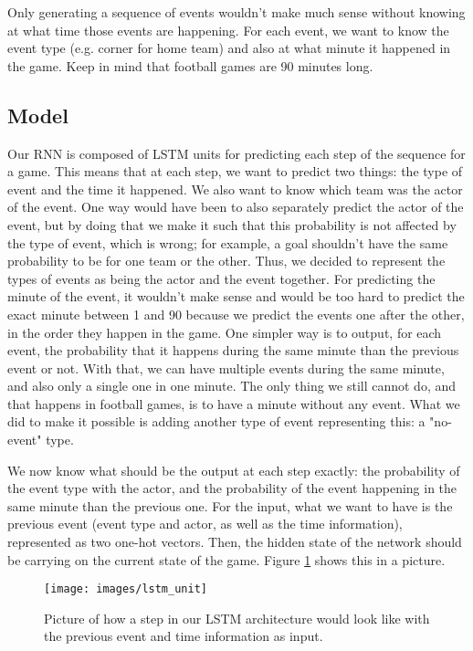 \documentclass[10pt,conference,onecolumn]{IEEEtran}
\begin{document}
Only generating a sequence of events wouldn't make much sense without knowing at what time those events are happening. For each event, we want to know the event type (e.g. corner for home team) and also at what minute it happened in the game. Keep in mind that football games are 90 minutes long.

\subsection{Model}
Our RNN is composed of LSTM units for predicting each step of the sequence for a game. This means that at each step, we want to predict two things: the type of event and the time it happened. We also want to know which team was the actor of the event. One way would have been to also separately predict the actor of the event, but by doing that we make it such that this probability is not affected by the type of event, which is wrong; for example, a goal shouldn't have the same probability to be for one team or the other. Thus, we decided to represent the types of events as being the actor and the event together. For predicting the minute of the event, it wouldn't make sense and would be too hard to predict the exact minute between 1 and 90 because we predict the events one after the other, in the order they happen in the game. One simpler way is to output, for each event, the probability that it happens during the same minute than the previous event or not. With that, we can have multiple events during the same minute, and also only a single one in one minute. The only thing we still cannot do, and that happens in football games, is to have a minute without any event. What we did to make it possible is adding another type of event representing this: a "no-event" type.

We now know what should be the output at each step exactly: the probability of the event type with the actor, and the probability of the event happening in the same minute than the previous one. For the input, what we want to have is the previous event (event type and actor, as well as the time information), represented as two one-hot vectors. Then, the hidden state of the network should be carrying on the current state of the game. Figure \ref{fig:lstm_unit} shows this in a picture.

\begin{figure}[H]
\centering
\texttt{[image: images/lstm\_unit]}
\caption{Picture of how a step in our LSTM architecture would look like with the previous event and time information as input.}
\label{fig:lstm_unit}
\end{figure}
\end{document}
